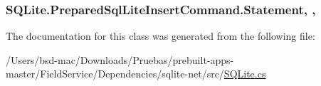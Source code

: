 \hypertarget{class_s_q_lite_1_1_prepared_sql_lite_insert_command_a5b8cfa2ccca99c02f38538be5d089c2d}{
\subsubsection[{Statement}]{ S\+Q\+Lite.\+Prepared\+Sql\+Lite\+Insert\+Command.\+Statement\hspace{0.3cm}{\ttfamily [get]}, {\ttfamily [set]}, {\ttfamily [protected]}}}\label{class_s_q_lite_1_1_prepared_sql_lite_insert_command_a5b8cfa2ccca99c02f38538be5d089c2d}


The documentation for this class was generated from the following file\+:\begin{DoxyCompactItemize}
\item 
/\+Users/bsd-\/mac/\+Downloads/\+Pruebas/prebuilt-\/apps-\/master/\+Field\+Service/\+Dependencies/sqlite-\/net/src/\hyperlink{_s_q_lite_8cs}{S\+Q\+Lite.\+cs}\end{DoxyCompactItemize}
